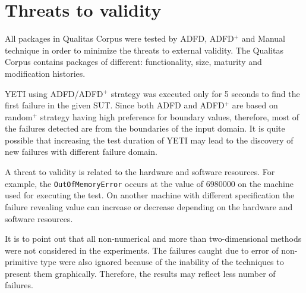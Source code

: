 


\section{Threats to validity} \label{sec:threat}
All packages in Qualitas Corpus were tested by ADFD, ADFD$^+$ and Manual technique in order to minimize the threats to external validity. The Qualitas Corpus contains packages of different: functionality, size, maturity and modification histories.

YETI using ADFD/ADFD$^+$ strategy was executed only for 5 seconds to find the first failure in the given SUT. Since both ADFD and ADFD$^+$ are based on random$^+$ strategy having high preference for boundary values, therefore, most of the failures detected are from the boundaries of the input domain. It is quite possible that increasing the test duration of YETI may lead to the discovery of new failures with different failure domain.

A threat to validity is related to the hardware and software resources. For example, the \verb+OutOfMemoryError+ occurs at the value of 6980000 on the machine used for executing the test. On another machine with different specification the failure revealing value can increase or decrease depending on the hardware and software resources.

It is to point out that all non-numerical and more than two-dimensional methods were not considered in the experiments. The failures caught due to error of non-primitive type were also ignored because of the inability of the techniques to present them graphically. Therefore, the results may reflect less number of failures.













